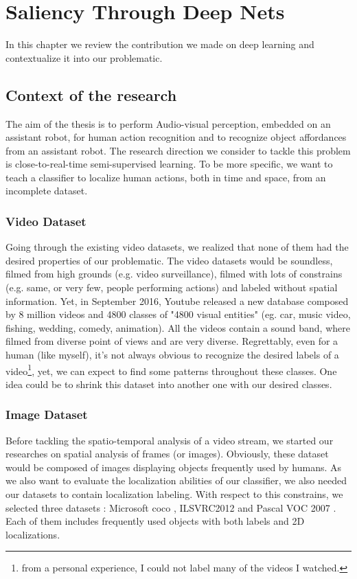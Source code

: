 \chapter{Saliency Through Deep Nets} %
\label{sec:saliency_through_deep_nets}
	
	In this chapter we review the contribution we made on deep learning and contextualize it into our problematic.

	\section{Context of the research}
	\label{sec:context_of_the_research}

		The aim of the thesis is to perform Audio-visual perception, embedded on an assistant robot, for human action recognition and to recognize object affordances from an assistant robot. The research direction we consider to tackle this problem is close-to-real-time semi-supervised learning. To be more specific, we want to teach a classifier to localize human actions, both in time and space, from an incomplete dataset. 	

		\subsection{Video Dataset}
		\label{sub:video_dataset}
			Going through the existing video datasets, we realized that none of them had the desired properties of our problematic. The video datasets would be soundless, filmed from high grounds (e.g. video surveillance), filmed with lots of constrains (e.g. same, or very few, people performing actions) and labeled without spatial information. Yet, in September 2016, Youtube released a new database \cite{abu2016youtube} composed by 8 million videos and 4800 classes of "4800 visual entities" (eg. car, music video, fishing, wedding, comedy, animation). All the videos contain a sound band, where filmed from diverse point of views and are very diverse. Regrettably, even for a human (like myself), it's not always obvious to recognize the desired labels of a video\footnote{from a personal experience, I could not label many of the videos I watched.}, yet, we can expect to find some patterns throughout these classes. One idea could be to shrink this dataset into another one with our desired classes.


		\subsection{Image Dataset}
		\label{sub:image_dataset}
			Before tackling the spatio-temporal analysis of a video stream, we started our researches on spatial analysis of frames (or images). Obviously, these dataset would be composed of images displaying objects frequently used by humans. As we also want to evaluate the localization abilities of our classifier, we also needed our datasets to contain localization labeling. With respect to this constrains, we selected three datasets : Microsoft coco \cite{lin2014microsoft}, ILSVRC2012 \cite{ILSVRC15} and Pascal VOC 2007 \cite{pascalVoc2007}. Each of them includes frequently used objects with both labels and 2D localizations. 



